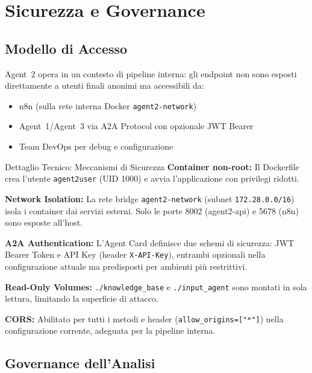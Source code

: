 \documentclass[12pt,a4paper]{report}
\begin{document}
\chapter{Sicurezza e Governance}

\section{Modello di Accesso}

Agent~2 opera in un contesto di pipeline interna: gli endpoint non sono
esposti direttamente a utenti finali anonimi ma accessibili da:
\begin{itemize}
  \item n8n (sulla rete interna Docker \texttt{agent2-network})
  \item Agent~1/Agent~3 via A2A Protocol con opzionale JWT Bearer
  \item Team DevOps per debug e configurazione
\end{itemize}

\begin{technicalbox}{Dettaglio Tecnico: Meccanismi di Sicurezza}
\textbf{Container non-root:} Il Dockerfile crea l'utente \texttt{agent2user}
(UID 1000) e avvia l'applicazione con privilegi ridotti.

\textbf{Network Isolation:} La rete bridge \texttt{agent2-network}
(subnet \texttt{172.28.0.0/16}) isola i container dai servizi esterni.
Solo le porte 8002 (agent2-api) e 5678 (n8n) sono esposte all'host.

\textbf{A2A Authentication:} L'Agent Card definisce due schemi di sicurezza:
JWT Bearer Token e API Key (header \texttt{X-API-Key}), entrambi opzionali
nella configurazione attuale ma predisposti per ambienti più restrittivi.

\textbf{Read-Only Volumes:} \texttt{./knowledge\_base} e \texttt{./input\_agent}
sono montati in sola lettura, limitando la superficie di attacco.

\textbf{CORS:} Abilitato per tutti i metodi e header (\texttt{allow\_origins=["*"]})
nella configurazione corrente, adeguata per la pipeline interna.
\end{technicalbox}

\section{Governance dell'Analisi}
\end{document}
